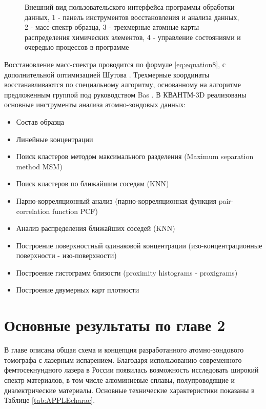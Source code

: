 \begin{figure}[htb]
	\caption{Внешний вид пользовательского интерфейса программы обработки данных, 1 - панель инструментов восстановления и анализа данных, 2 - масс-спектр образца, 3 - трехмерные атомные карты распределения химических элементов, 4 - управление состояниями и очередью процессов в программе}
	\label{fig:APPLE_kvant}
\end{figure}

Восстановление масс-спектра проводится по формуле \cref{eq:equation8}, с дополнительной оптимизацией Шутова \cite{Shutov19}. Трехмерные координаты восстанавливаются по специальному алгоритму, основанному на алгоритме предложенным группой под руководством Bas \cite{Bas95}. В КВАНТМ-3D реализованы основные инструменты анализа атомно-зондовых данных:

\begin{itemize}
	\item Состав образца
	\item Линейные концентрации
	\item Поиск кластеров методом максимального разделения (Maximum separation method MSM)
	\item Поиск кластеров по ближайшим соседям (KNN)
	\item Парно-корреляционный анализ (парно-корреляционная функция pair-correlation function PCF)
	\item Анализ распределения ближайших соседей (KNN)
	\item Построение поверхностный одинаковой концентрации (изо-концентрационные поверхности - изо-поверхности)
	\item Построение гистограмм близости (proximity histograms - proxigrams)
	\item Построение двумерных карт плотности
\end{itemize}




\FloatBarrier
\section{Основные результаты по главе 2}\label{sec:ch2/sec6}

В главе описана общая схема и концепция разработанного атомно-зондового томографа с лазерным испарением. Благодаря использованию современного фемтосекнундного лазера в России появилась возможность исследовать широкий спектр материалов, в том числе алюминиевые сплавы, полупроводящие и диэлектрические материалы. Основные технические характеристики показаны в Таблице \cref{tab:APPLEcharac}.

